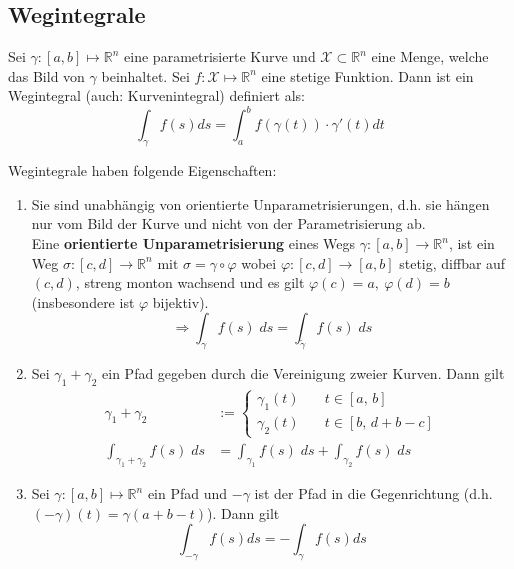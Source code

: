 \documentclass[a4paper,10pt]{article}
\def\R{\mathbb{R}}
\def\X{\mathcal{X}}
\begin{document}
\subsection{Wegintegrale}
Sei $\gamma : \left[a,b\right] \mapsto \R^n$ eine parametrisierte Kurve und $\X \subset \R^n$ eine Menge, welche das Bild von $\gamma$ beinhaltet. Sei $f : \X \mapsto \R^n$ eine stetige Funktion. Dann ist ein Wegintegral (auch: Kurvenintegral) definiert als:
$$\int_\gamma f(s) ds = \int_a^b f(\gamma(t)) \cdot \gamma'(t) dt$$

Wegintegrale haben folgende Eigenschaften:
\begin{enumerate}
    \item Sie sind unabhängig von orientierte Unparametrisierungen, d.h. sie hängen nur vom Bild der Kurve und nicht von der Parametrisierung ab.\\
        Eine \textbf{orientierte Unparametrisierung} eines Wegs $\gamma:[a, b] \rightarrow \mathbb{R}^n$, ist ein Weg $\sigma:[c, d] \rightarrow \mathbb{R}^{n} \text { mit } \sigma=\gamma\circ \varphi$ wobei $\varphi:[c, d] \rightarrow[a, b]$ stetig, diffbar auf $(c,d)$, streng monton wachsend und es gilt $\varphi(c)=a,\ \varphi(d)=b$ (insbesondere ist $\varphi$ bijektiv).
        $$\Rightarrow   \int_\gamma f(s) \; ds = \int_{\tilde{\gamma}} f(s) \; ds $$
    \item Sei $\gamma_1 + \gamma_2$ ein Pfad gegeben durch die Vereinigung zweier Kurven. Dann gilt
            \begin{align*}
            \gamma_1 + \gamma_2                   & :=                                                       
            \begin{cases}
            \gamma_1(t) \quad                     & t \in [a, \, b]                                          \\
            \gamma_2(t) \quad                     & t \in [b, \, d + b - c]                                  
            \end{cases}\\
            \int_{\gamma_1 + \gamma_2} f(s) \; ds & = \int_{\gamma_1} f(s) \; ds + \int_{\gamma_2} f(s)\; ds 
            \end{align*}
    \item Sei $\gamma : \left[a,b\right] \mapsto \R^n$ ein Pfad und $-\gamma$ ist der Pfad in die Gegenrichtung (d.h. $(-\gamma)(t) = \gamma(a + b - t)$). Dann gilt
            $$\int_{-\gamma} f(s)ds = -\int_\gamma f(s) ds$$
\end{enumerate}
\end{document}
